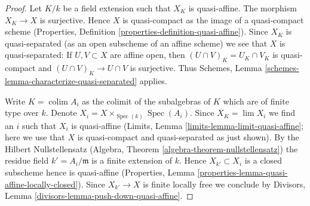 \documentclass[10pt,a4paper]{amsart}
\theoremstyle{plain}
\theoremstyle{definition}
\theoremstyle{remark}
\numberwithin{equation}{subsection}
\def\lim{\mathop{\mathrm{lim}}\nolimits}
\def\colim{\mathop{\mathrm{colim}}\nolimits}
\def\Spec{\mathop{\mathrm{Spec}}}
\begin{document}
\begin{proof}
Let $K/k$ be a field extension such that $X_K$ is quasi-affine.
The morphism $X_K \to X$ is surjective. Hence $X$ is quasi-compact
as the image of a quasi-compact scheme (Properties, Definition
\ref{properties-definition-quasi-affine}). Since $X_K$ is quasi-separated
(as an open subscheme of an affine scheme)
we see that $X$ is quasi-separated: If $U, V \subset X$ are
affine open, then $(U \cap V)_K = U_K \cap V_K$ is quasi-compact
and $(U \cap V)_K \to U \cap V$ is surjective. Thus
Schemes, Lemma \ref{schemes-lemma-characterize-quasi-separated} applies.

\medskip\noindent
Write $K = \colim A_i$ as the colimit of the subalgebras of $K$
which are of finite type over $k$. Denote
$X_i = X \times_{\Spec(k)} \Spec(A_i)$.
Since $X_K = \lim X_i$ we find an $i$ such that $X_i$ is quasi-affine
(Limits, Lemma \ref{limits-lemma-limit-quasi-affine};
here we use that $X$ is quasi-compact and quasi-separated as
just shown). By the Hilbert Nullstellensatz
(Algebra, Theorem \ref{algebra-theorem-nullstellensatz})
the residue field $k' = A_i/\mathfrak m$ is a finite
extension of $k$. Hence $X_{k'} \subset X_i$ is a closed
subscheme hence is quasi-affine (Properties, Lemma
\ref{properties-lemma-quasi-affine-locally-closed}).
Since $X_{k'} \to X$ is finite locally free we conclude by
Divisors, Lemma \ref{divisors-lemma-push-down-quasi-affine}.
\end{proof}
\end{document}
